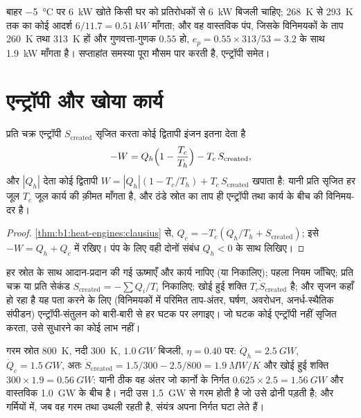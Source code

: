 \begin{example}[ऊष्मा पंप या प्रतिरोधक?]\label{ex:b1:heat-engines:hpvsresistor}
बाहर \qty{-5}{\degreeCelsius} पर \qty{6}{kW} खोते किसी घर को प्रतिरोधकों से
\qty{6}{kW} बिजली चाहिए; \qty{268}{K} से \qty{293}{K} तक का कोई आदर्श  $6/11.7 = \qty{0.51}{kW}$ माँगता; और वह वास्तविक पंप, जिसके विनिमयकों
के ताप \qty{260}{K} तथा \qty{313}{K} हों और गुणवत्ता-गुणक
$0.55$ हो, $e_p = 0.55 \times 313/53 = 3.2$ के साथ \qty{1.9}{kW} माँगता है।
सप्ताहांत समस्या पूरा मौसम पार करती है, एन्ट्रॉपी समेत।
\end{example}

\section{एन्ट्रॉपी और खोया कार्य}

\begin{theorem}[खोया कार्य]\label{thm:b1:heat-engines:lostwork}
प्रति चक्र एन्ट्रॉपी $S_{\mathrm{created}}$ सृजित करता कोई द्वितापी इंजन
इतना देता है
\[
-W = Q_h\Bigl(1 - \frac{T_c}{T_h}\Bigr) - T_c\,S_{\mathrm{created}} ,
\]
और $|Q_h|$ देता कोई द्वितापी 
$W = |Q_h|(1 - T_c/T_h) + T_c\,S_{\mathrm{created}}$ खपाता है: यानी प्रति
 सृजित हर जूल $T_c$ जूल कार्य की क़ीमत माँगता है, और ठंडे स्रोत का
ताप ही एन्ट्रॉपी तथा कार्य के बीच की विनिमय-दर है।
\end{theorem}

\begin{proof}
\cref{thm:b1:heat-engines:clausius} से, $Q_c = -T_c(Q_h/T_h + S_{\mathrm{created}})$;
इसे $-W = Q_h + Q_c$ में रखिए। पंप के लिए वही दोनों संबंध
$Q_h < 0$ के साथ लिखिए।
\end{proof}

\begin{method}[किसी मशीन का लेखा-जोखा]\label{meth:b1:heat-engines:audit}
हर स्रोत के साथ आदान-प्रदान की गई ऊष्माएँ और कार्य नापिए (या निकालिए);
पहला नियम जाँचिए; प्रति चक्र या प्रति सेकंड $S_{\mathrm{created}} = -\sum Q_i/T_i$
निकालिए; खोई हुई शक्ति $T_c\dot S_{\mathrm{created}}$ है; और सृजन कहाँ हो रहा
है यह पता करने के लिए (विनिमयकों में परिमित ताप-अंतर, घर्षण, अवरोधन,
अनर्ध-स्थैतिक संपीडन) एन्ट्रॉपी-संतुलन को बारी-बारी से हर घटक पर लगाइए। जो
घटक कोई एन्ट्रॉपी नहीं सृजित करता, उसे सुधारने का कोई लाभ नहीं।
\end{method}

\begin{example}[किसी बिजलीघर का लेखा]\label{ex:b1:heat-engines:audit}
गरम स्रोत \qty{800}{K}, नदी \qty{300}{K}, $\qty{1.0}{GW}$ बिजली,
$\eta = 0.40$ पर: $\dot Q_h = \qty{2.5}{GW}$, $\dot Q_c = \qty{1.5}{GW}$, अतः
$\dot S_{\mathrm{created}} = 1.5/300 - 2.5/800 = \qty{1.9}{MW/K}$ और खोई हुई
शक्ति $300 \times 1.9 = \qty{0.56}{GW}$: यानी ठीक वह अंतर जो कार्नो के
निर्गत $0.625 \times 2.5 = \qty{1.56}{GW}$ और वास्तविक \qty{1.0}{GW} के बीच है।
नदी उस \qty{1.5}{GW} से गरम होती है जो उसे ढोनी पड़ती है; और गर्मियों में,
जब वह गरम तथा उथली रहती है, संयंत्र अपना निर्गत घटा लेते हैं।
\end{example}

